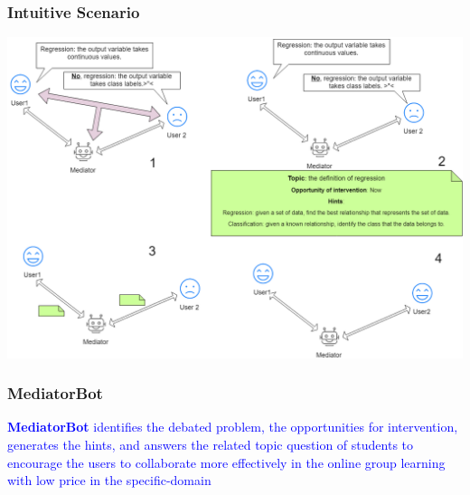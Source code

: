 \documentclass{beamer}
\begin{document}
\begin{frame}


\frametitle{Intuitive Scenario}



\begin{center}
	\includegraphics[width=.9\columnwidth]{cvf1}
\end{center}


\end{frame}


\begin{frame}
\frametitle{MediatorBot}
\begin{center}
	
\end{center}
\textcolor{blue}{\textbf{MediatorBot}  identifies the debated problem, the opportunities for intervention, generates the hints, and answers the related topic question of students to encourage the users to collaborate more effectively in the online group learning with low price in the specific-domain}
\end{frame}








\end{document}
